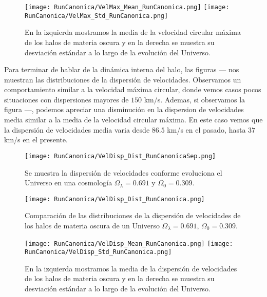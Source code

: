 \begin{figure}[ht!]
    \centering
    \texttt{[image: RunCanonica/VelMax\_Mean\_RunCanonica.png]}
    \texttt{[image: RunCanonica/VelMax\_Std\_RunCanonica.png]}
    \caption[Media y desviación estándar de la velocidad circular máxima de un Universo $\Omega_\lambda = 0.691 $, $\Omega_0 = 0.309$]{\footnotesize En la izquierda mostramos la media de la velocidad circular máxima de los halos de materia oscura y en la derecha se muestra su desviación estándar a lo largo de la evolución del Universo.}
    \label{fig:VelMaxStatsCanonRun}
\end{figure}
 
Para terminar de hablar de la dinámica interna del halo, las figuras --- nos muestran las distribuciones de la dispersión de velocidades. Observamos un comportamiento similar a la velocidad máxima circular, donde vemos casos pocos situaciones con dispersiones mayores de $150$ km/s. Ademas, si observamos la figura ---, podemos apreciar una disminución en la dispersion de velocidades media similar a la media de la velocidad circular máxima. En este caso vemos que la dispersión de velocidades media varia desde $86.5$ km/s en el pasado, hasta $37$ km/s en el presente. 


\begin{figure}[ht!]
    \centering
    \texttt{[image: RunCanonica/VelDisp\_Dist\_RunCanonicaSep.png]}
    \caption[Dispersión de velocidades en la evolución de un Universo $\Omega_\lambda = 0.691 $, $\Omega_0 = 0.309$]{\footnotesize Se muestra la dispersión de velocidades conforme evoluciona el Universo en una cosmología $\Omega_\lambda = 0.691 $ y $\Omega_0 = 0.309$.}
    \label{fig:VelDispDistCanonRunSep}
\end{figure}

\begin{figure}[ht!]
    \centering
    \texttt{[image: RunCanonica/VelDisp\_Dist\_RunCanonica.png]}
    \caption[Distribución de la dispersión de velocidades de un Universo $\Omega_\lambda = 0.691 $, $\Omega_0 = 0.309$]{\footnotesize Comparación de las distribuciones de la dispersión de velocidades de los halos de materia oscura de un Universo $\Omega_\lambda = 0.691 $, $\Omega_0 = 0.309$.}
    \label{fig:VelDispDistCanonRun}
\end{figure}

\begin{figure}[ht!]
    \centering
    \texttt{[image: RunCanonica/VelDisp\_Mean\_RunCanonica.png]}
    \texttt{[image: RunCanonica/VelDisp\_Std\_RunCanonica.png]}
    \caption[Media y desviación estándar de la dispersión de velocidades de un Universo $\Omega_\lambda = 0.691 $, $\Omega_0 = 0.309$]{\footnotesize En la izquierda mostramos la media de la dispersión de velocidades de los halos de materia oscura y en la derecha se muestra su desviación estándar a lo largo de la evolución del Universo.}
    \label{fig:VelDispStatsCanonRun}
\end{figure}
 

